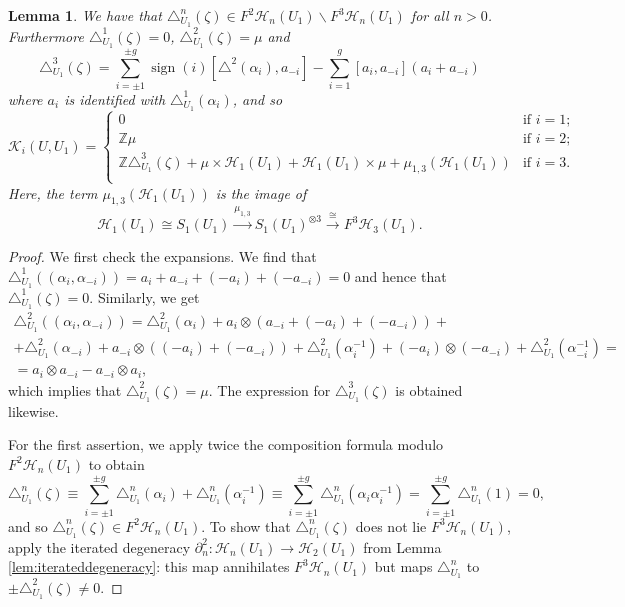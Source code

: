 \documentclass[12pt,letterpaper]{amsart}
\numberwithin{equation}{section}
\def\ZZ{{\mathbb Z}}
\def\ssm{\smallsetminus}
\def\tri{\triangle}
\def\Hcal{{\mathcal H}}
\def\Kcal{{\mathcal K}}
\newcommand\sign{\operatorname{sign}}
\newtheorem{lemma}[theorem]{Lemma}
\theoremstyle{remark}
\begin{document}
\begin{lemma}\label{lemma:expansion_delta}
We have that $\tri_{{U_1}}^n(\zeta)\in F^2\Hcal_n({U_1})\ssm F^3\Hcal_n({U_1})$ for all $n>0$. Furthermore $\tri^1_{U_1}(\zeta)=0$, $\tri^2_{U_1}(\zeta)=\mu$ and
\begin{equation*}
\textstyle \tri_{U_1}^3(\zeta)= \sum_{i=\pm 1}^{\pm g} \sign (i)[\tri^2(\alpha_i), a_{-i}] -\sum_{i=1}^g [a_i,a_{-i}](a_i+a_{-i}) 
\end{equation*}
where $a_i$ is identified with $\tri_{U_1}^1(\alpha_i)$, and so
\[
\Kcal_i(U,U_1)=
\begin{cases}
0 &\text{if $i=1$;}\\
\ZZ\mu  &\text{if $i=2$;}\\ 
\ZZ \tri^3_{U_1}(\zeta)+\mu\times\Hcal_1(U_1)+\Hcal_1(U_1)\times \mu +\mu_{1,3}(\Hcal_1(U_1)) &\text{if $i=3$.}\\ 
\end{cases}
\]
Here, the term $\mu_{1,3}(\Hcal_1(U_1))$ is the image of
$$
 \Hcal_1(U_1)\cong S_1(U_1)\xrightarrow{\mu_{1,3}} S_1(U_1)^{\otimes 3}\xrightarrow{\cong} F^3\Hcal_3(U_1).
$$
\end{lemma}
\begin{proof}
We first check the expansions. We find  that $\tri_{U_1}^1((\alpha_i, \alpha_{-i}))= a_i+a_{-i}+ (-a_i) + (-a_{-i})=0$ and hence that $\tri_{U_1}^1(\zeta)=0$.
 Similarly, we get
 \begin{multline*}
\tri_{U_1}^2((\alpha_i, \alpha_{-i}))=\tri_{U_1}^2(\alpha_i) + a_i\otimes (a_{-i}+ (-a_i)+(-a_{-i}))+ \\
+ \tri_{U_1}^2(\alpha_{-i}) +  a_{-i}\otimes ((-a_i)+(-a_{-i}))+\tri_{U_1}^2(\alpha_{i}^{-1})+ (-a_{i})\otimes (-a_{-i}) + \tri_{U_1}^2(\alpha_{-i}^{-1})=\\=
a_i\otimes a_{-i}-a_{-i}\otimes a_i, 
\end{multline*}
which implies that $\tri_{U_1}^2(\zeta)=\mu$. The expression for  $\tri_{U_1}^3(\zeta)$ is obtained likewise.

For the first assertion, we apply twice the composition formula modulo $F^2\Hcal_n(U_1)$ to obtain  
$$
\textstyle \tri^n_{U_1}(\zeta)\equiv \sum_{i=\pm 1}^{\pm g} \tri^n_{U_1}(\alpha_i)+\tri^n_{U_1}(\alpha_i^{-1})\equiv \sum_{i=\pm 1}^{\pm g} \tri^n_{U_1}(\alpha_i\alpha_i^{-1})=\sum_{i=\pm 1}^{\pm g} \tri^n_{U_1}(1)= 0,
$$
and so $\tri^n_{U_1}(\zeta) \in F^2\Hcal_n(U_1)$. To show that $\tri^n_{U_1}(\zeta)$ does not lie $F^3\Hcal_n(U_1)$, apply the iterated degeneracy $\partial^2_n:\Hcal_n(U_1)\to \Hcal_2(U_1)$ from Lemma \ref{lem:iterateddegeneracy}: this map annihilates $F^3\Hcal_n(U_1)$ but maps $\tri^n_{U_1}$ to $\pm \tri^2_{U_1}(\zeta)\neq 0$.
\end{proof}
\end{document}

